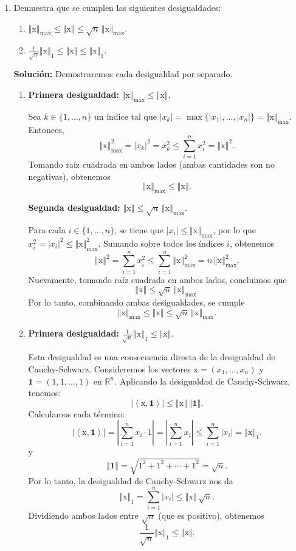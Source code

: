 \documentclass[12pt]{article}
\newcommand{\abs}[1]{\left\vert#1\right\vert}
\newcommand{\norm}[1]{\left\Vert#1\right\Vert}
\newcommand{\R}{\mathbb R}
\newcommand{\x}{\mathrm x}
\newcommand{\lbil}{\left <}
\newcommand{\rbil}{\right >}
\begin{document}
\begin{enumerate}
\item Demuestra que se cumplen las siguientes desigualdades:
\begin{enumerate}[(1)]
\item $\norm{\x}_{\max}\leq \norm{\x}\leq \sqrt{n}\,\norm{\x}_{\max}$.
\item $\frac{1}{\sqrt{n}}\norm{\x}_1\leq \norm{\x}\leq \norm{\x}_1$.
\end{enumerate}

\textbf{Solución: }
Demostraremos cada desigualdad por separado.

\begin{enumerate}[(1)]
\item \textbf{Primera desigualdad:} $\norm{\x}_{\max}\leq \norm{\x}$.

Sea $k \in \{1, \dots, n\}$ un índice tal que $\abs{x_k} = \max\{\abs{x_1}, \dots, \abs{x_n}\} = \norm{\x}_{\max}$. Entonces,
\[
\norm{\x}_{\max}^2 = \abs{x_k}^2 = x_k^2 \leq \sum_{i=1}^{n} x_i^2 = \norm{\x}^2.
\]
Tomando raíz cuadrada en ambos lados (ambas cantidades son no negativas), obtenemos
\[
\norm{\x}_{\max} \leq \norm{\x}.
\]

\textbf{Segunda desigualdad:} $\norm{\x}\leq \sqrt{n}\,\norm{\x}_{\max}$.

Para cada $i \in \{1, \dots, n\}$, se tiene que $\abs{x_i} \leq \norm{\x}_{\max}$, por lo que $x_i^2 = \abs{x_i}^2 \leq \norm{\x}_{\max}^2$. Sumando sobre todos los índices $i$, obtenemos
\[
\norm{\x}^2 = \sum_{i=1}^{n} x_i^2 \leq \sum_{i=1}^{n} \norm{\x}_{\max}^2 = n\,\norm{\x}_{\max}^2.
\]
Nuevamente, tomando raíz cuadrada en ambos lados, concluimos que
\[
\norm{\x} \leq \sqrt{n}\,\norm{\x}_{\max}.
\]
Por lo tanto, combinando ambas desigualdades, se cumple
\[
\norm{\x}_{\max}\leq \norm{\x}\leq \sqrt{n}\,\norm{\x}_{\max}.
\]

\item \textbf{Primera desigualdad:} $\frac{1}{\sqrt{n}}\norm{\x}_1\leq \norm{\x}$.

Esta desigualdad es una consecuencia directa de la desigualdad de Cauchy-Schwarz. Consideremos los vectores $\x = (x_1, \dots, x_n)$ y $\mathbf{1} = (1, 1, \dots, 1)$ en $\R^n$. Aplicando la desigualdad de Cauchy-Schwarz, tenemos:
\[
\abs{\lbil \x, \mathbf{1} \rbil} \leq \norm{\x}\,\norm{\mathbf{1}}.
\]
Calculamos cada término:
\[
\abs{\lbil \x, \mathbf{1} \rbil} = \abs{\sum_{i=1}^{n} x_i \cdot 1} = \abs{\sum_{i=1}^{n} x_i} \leq \sum_{i=1}^{n} \abs{x_i} = \norm{\x}_1.
\]
y
\[
\norm{\mathbf{1}} = \sqrt{1^2 + 1^2 + \cdots + 1^2} = \sqrt{n}.
\]
Por lo tanto, la desigualdad de Cauchy-Schwarz nos da
\[
\norm{\x}_1 = \sum_{i=1}^{n} \abs{x_i} \leq \norm{\x}\,\sqrt{n}.
\]
Dividiendo ambos lados entre $\sqrt{n}$ (que es positivo), obtenemos
\[
\frac{1}{\sqrt{n}}\norm{\x}_1 \leq \norm{\x}.
\]


\end{enumerate}
\end{enumerate}
\end{document}
